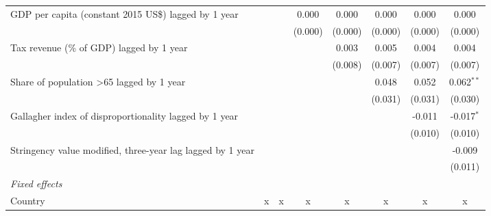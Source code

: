 \begin{tabular}{lccccccc}
   GDP per capita (constant 2015 US\$) lagged by 1 year                            &               &               & 0.000         & 0.000         & 0.000         & 0.000        & 0.000\\   
                                                                                   &               &               & (0.000)       & (0.000)       & (0.000)       & (0.000)      & (0.000)\\   
   Tax revenue (\% of GDP) lagged by 1 year                                        &               &               &               & 0.003         & 0.005         & 0.004        & 0.004\\   
                                                                                   &               &               &               & (0.008)       & (0.007)       & (0.007)      & (0.007)\\   
   Share of population >65 lagged by 1 year                                        &               &               &               &               & 0.048         & 0.052        & 0.062$^{**}$\\   
                                                                                   &               &               &               &               & (0.031)       & (0.031)      & (0.030)\\   
   Gallagher index of disproportionality lagged by 1 year                          &               &               &               &               &               & -0.011       & -0.017$^{*}$\\   
                                                                                   &               &               &               &               &               & (0.010)      & (0.010)\\   
   Stringency value modified, three-year lag lagged by 1 year                      &               &               &               &               &               &              & -0.009\\   
                                                                                   &               &               &               &               &               &              & (0.011)\\   
   \emph{Fixed effects}\\
   Country                                                                         & x             & x             & x             & x             & x             & x            & x\\  

\end{tabular}

